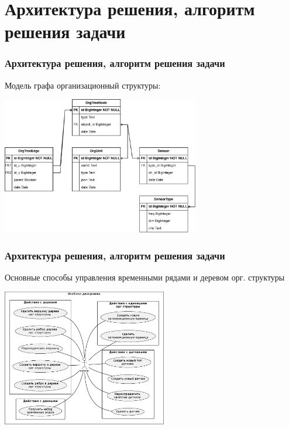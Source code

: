 \documentclass[pdf, hyperref={unicode}, aspectratio=169]{beamer}
\begin{document}
\section{Архитектура решения, алгоритм решения задачи}
\begin{frame}
	\frametitle{Архитектура решения, алгоритм решения задачи}
	
	Модель графа организационный структуры:
	
	\begin{center}
		\includegraphics[height = 6cm]{pg.drawio.eps}
	\end{center}
\end{frame}


\begin{frame}
	\frametitle{Архитектура решения, алгоритм решения задачи}
	
	Основные способы управления временными рядами и деревом орг. структуры
	\begin{center}
		\includegraphics[height = 6cm]{usecases.eps}
	\end{center}
\end{frame}
\end{document}
